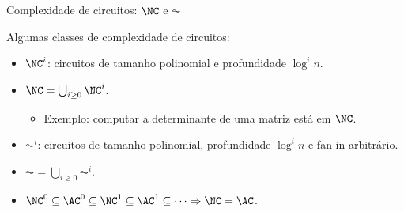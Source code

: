 \documentclass[landscape]{beamer}
\begin{document}
\begin{frame} {Complexidade de circuitos: $\NC$ e $\AC$}

Algumas classes de complexidade de circuitos:

\begin{itemize}

	\item $\NC^{i}$: circuitos de tamanho polinomial e profundidade $\log^{i} n$.
	
	\item $\NC = \bigcup_{i \geq 0} \NC^{i}$.
	
	\begin{itemize}
	
		\item Exemplo: computar a determinante de uma matriz está em $\NC$.
	
	\end{itemize}
	
	\item $\AC^{i}$: circuitos de tamanho polinomial, profundidade $\log^{i} n$ e fan-in arbitrário.
	
	\item $\AC = \bigcup_{i \geq 0} \AC^{i}$.
	
	\item $\NC^{0} \subseteq \AC^{0} \subseteq \NC^{1} \subseteq \AC^{1} \subseteq \dots \Rightarrow \NC = \AC$.

\end{itemize}

\end{frame}

\end{document}

